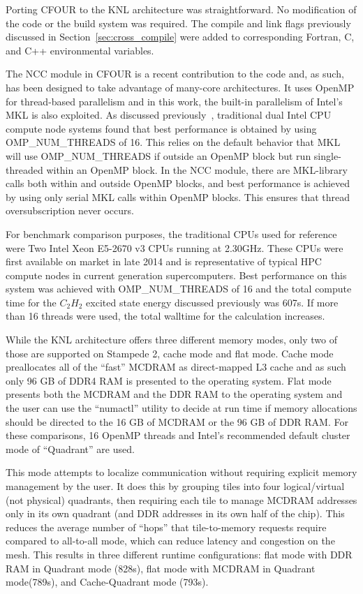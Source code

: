 Porting CFOUR to the KNL architecture was straightforward. No modification of the code or the build
system was required. The compile and link flags previously discussed in Section~\ref{sec:cross_compile}
were added to corresponding Fortran, C, and C++ environmental variables.

The NCC module in CFOUR is a recent contribution to the code and, as such, has been designed to take
advantage of many-core architectures. It uses OpenMP for thread-based parallelism and in this work, the
built-in parallelism of Intel's MKL is also exploited. As discussed previously~\cite{ncc:15},
traditional dual Intel CPU compute node systems found that best performance is obtained 
by using OMP\_NUM\_THREADS of 16. This relies on the default behavior that MKL will use OMP\_NUM\_THREADS 
if outside an OpenMP block but run single-threaded within an OpenMP block. 
In the NCC module, there are MKL-library calls both within and outside OpenMP blocks, and best performance is 
achieved by using only serial MKL calls within OpenMP blocks. This ensures that thread oversubscription never occurs.

For benchmark comparison purposes, the traditional CPUs used for reference were Two Intel Xeon E5-2670 v3 CPUs
running at 2.30GHz. These CPUs were first available on market in late 2014 and is representative of typical HPC 
compute nodes in current generation supercomputers. Best performance on this system was achieved with 
OMP\_NUM\_THREADS of 16 and the total compute time for the $C_2H_2$ excited state energy discussed previously
was 607s.
If more than 16 threads were used, the total walltime for the calculation increases. 

While the KNL architecture offers three different memory modes, only two of those are supported on Stampede 2,
cache mode and flat mode. Cache mode preallocates all of the ``fast'' MCDRAM as direct-mapped L3 cache and
as such only 96 GB of DDR4 RAM is presented to the operating system. Flat mode presents both the MCDRAM and the 
DDR RAM to the operating system and the user can use the ``numactl'' utility to decide at run time if memory 
allocations should be directed to the 16 GB of MCDRAM or the 96 GB of DDR RAM. For these comparisons, 16 OpenMP
threads and Intel's recommended default cluster mode of ``Quadrant'' are used.

This mode attempts to localize communication without requiring explicit memory management by the user. 
It does this by grouping tiles into four logical/virtual (not physical) quadrants, then requiring each tile 
to manage MCDRAM addresses only in its own quadrant (and DDR addresses in its own half of the chip). 
This reduces the average number of ``hops'' that tile-to-memory requests require compared to all-to-all mode, 
which can reduce latency and congestion on the mesh. This results in three different runtime configurations:
flat mode with DDR RAM in Quadrant mode (828s), flat mode with MCDRAM in Quadrant mode(789s), and
Cache-Quadrant mode (793s). 


